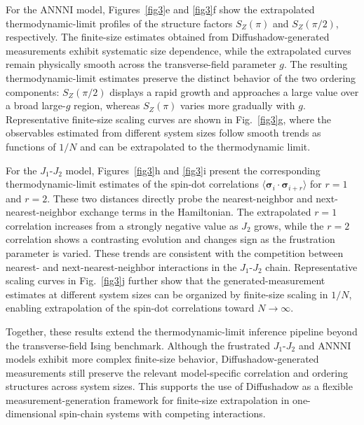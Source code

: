 \documentclass[pdflatex,sn-mathphys-num]{sn-jnl}%
\theoremstyle{thmstyleone}%
\theoremstyle{thmstyletwo}%
\theoremstyle{thmstylethree}%
\begin{document}
For the ANNNI model, Figures~\ref{fig3}e and \ref{fig3}f show the extrapolated thermodynamic-limit profiles of the structure factors \(S_Z(\pi)\) and \(S_Z(\pi/2)\), respectively. The finite-size estimates obtained from Diffushadow-generated measurements exhibit systematic size dependence, while the extrapolated curves remain physically smooth across the transverse-field parameter \(g\). The resulting thermodynamic-limit estimates preserve the distinct behavior of the two ordering components: \(S_Z(\pi/2)\) displays a rapid growth and approaches a large value over a broad large-\(g\) region, whereas \(S_Z(\pi)\) varies more gradually with \(g\). Representative finite-size scaling curves are shown in Fig.~\ref{fig3}g, where the observables estimated from different system sizes follow smooth trends as functions of \(1/N\) and can be extrapolated to the thermodynamic limit.

For the $J_1$-$J_2$ model, Figures~\ref{fig3}h and \ref{fig3}i present the corresponding thermodynamic-limit estimates of the spin-dot correlations \(\langle \boldsymbol{\sigma}_i\cdot\boldsymbol{\sigma}_{i+r}\rangle\) for \(r=1\) and \(r=2\). These two distances directly probe the nearest-neighbor and next-nearest-neighbor exchange terms in the Hamiltonian. The extrapolated \(r=1\) correlation increases from a strongly negative value as \(J_2\) grows, while the \(r=2\) correlation shows a contrasting evolution and changes sign as the frustration parameter is varied. These trends are consistent with the competition between nearest- and next-nearest-neighbor interactions in the $J_1$-$J_2$ chain. Representative scaling curves in Fig.~\ref{fig3}j further show that the generated-measurement estimates at different system sizes can be organized by finite-size scaling in \(1/N\), enabling extrapolation of the spin-dot correlations toward \(N\to\infty\).

Together, these results extend the thermodynamic-limit inference pipeline beyond the transverse-field Ising benchmark. Although the frustrated $J_1$-$J_2$ and ANNNI models exhibit more complex finite-size behavior, Diffushadow-generated measurements still preserve the relevant model-specific correlation and ordering structures across system sizes. This supports the use of Diffushadow as a flexible measurement-generation framework for finite-size extrapolation in one-dimensional spin-chain systems with competing interactions.
\end{document}

